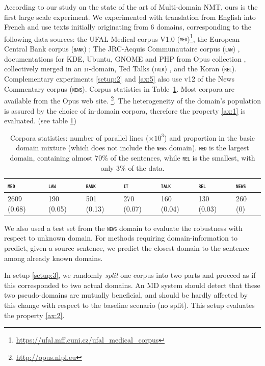 \documentclass[12pt,a4paper,twoside]{report}
\theoremstyle{definition}
\newcommand{\domain}[1]{\texttt{\textsc{#1}}}
\begin{document}
According to our study on the state of the art of Multi-domain NMT, ours is the first large scale experiment. We experimented with translation from English into French and use texts initially originating from 6 domains, corresponding to the following data sources: the UFAL Medical corpus V1.0 (\domain{med})\footnote{\url{https://ufal.mff.cuni.cz/ufal_medical_corpus}}, the European Central Bank corpus (\domain{bank}) \cite{Tiedemann12parallel}; The JRC-Acquis Communautaire corpus (\domain{law}) \cite{Steinberger06acquis}, documentations for KDE, Ubuntu, GNOME and PHP from Opus collection \cite{Tiedemann09news}, collectively merged in an \domain{it}-domain, Ted Talks (\domain{talk}) \cite{Cettolo12wit}, and the Koran (\domain{rel}). Complementary experiments \ref{setup:2} and \ref{ax:5}  also use v12 of the News Commentary corpus (\domain{news}). Corpus statistics in Table~\ref{tab:Corpora7}. Most corpora are available from the Opus web site. \footnote{\url{http://opus.nlpl.eu}}. The heterogeneity of the domain’s population is assured by the choice of in-domain corpora, therefore the property \ref{ax:1} is evaluated. (see table \ref{tab:Corpora7})

\begin{table}[htbp]
  \centering
  \begin{tabular}{ |lllllll|} %
    \hline
    \domain{med} & \domain{law} & \domain{bank} & \domain{it} & \domain{talk} & \domain{rel} & \domain{news} \\
    \hline
    2609 (0.68) & 190 (0.05)  & 501 (0.13) & 270 (0.07) & 160 (0.04) & 130 (0.03) & 260 (0) \\
    \hline
  \end{tabular}
\caption{Corpora statistics: number of parallel lines ($\times 10^3$) and proportion in the basic domain mixture (which does not include the \domain{news} domain). \domain{med} is the largest domain, containing almost 70\% of the sentences, while \domain{rel} is the smallest, with only 3\% of the data.}
\label{tab:Corpora7}
\end{table}

We also used a test set from the \domain{news} domain to evaluate the robustness with respect to unknown domain. For methods requiring domain-information to predict, given a source sentence, we predict the closest domain to the sentence among already known domains.

In setup \ref{setup:3}, we randomly \emph{split} one corpus into two parts and proceed as if this corresponded to two actual domains. An MD system should detect that these two pseudo-domains are mutually beneficial, and should be hardly affected by this change with respect to the baseline scenario (no split). This setup evaluates the property \ref{ax:2}.
\end{document}
